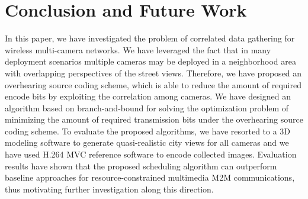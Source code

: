 \section{Conclusion and Future Work}
\label{sec::conclusion}
In this paper, we have investigated the problem of correlated data gathering for wireless multi-camera networks.
We have leveraged the fact that in many deployment scenarios multiple cameras may be deployed in a neighborhood area with overlapping perspectives of the street views.
Therefore, we have proposed an overhearing source coding scheme, which is able to reduce the amount of required encode bits by exploiting the correlation among cameras. 
We have designed an algorithm based on branch-and-bound for solving the optimization problem of minimizing the amount of required transmission bits under the overhearing source coding scheme.
To evaluate the proposed algorithms, we have resorted to a 3D modeling software to generate quasi-realistic city views for all cameras and we have used H.264 MVC reference software to encode collected images.
Evaluation results have shown that the proposed scheduling algorithm can outperform baseline approaches for resource-constrained multimedia M2M communications, thus motivating further investigation along this direction.